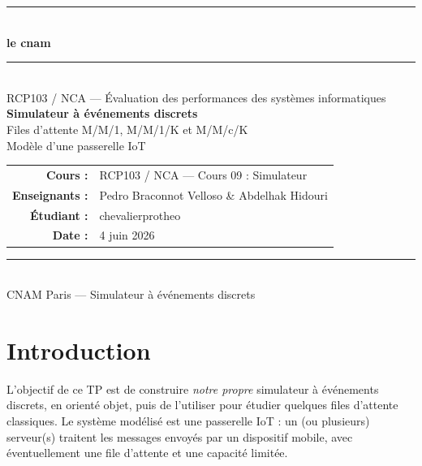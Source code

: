 \documentclass[11pt,a4paper]{article}
\begin{document}
\begin{titlepage}
\begin{center}
\vspace*{1cm}

{\color{cnamred}\rule{\textwidth}{2pt}}\\[0.3cm]
{\Large\bfseries le cnam}\\[0.2cm]
{\color{cnamred}\rule{\textwidth}{2pt}}\\[3cm]

{\Large RCP103 / NCA --- Évaluation des performances des systèmes informatiques}\\[1.5cm]

{\color{cnamred}\Huge\bfseries Simulateur à événements discrets}\\[0.6cm]
{\LARGE Files d'attente M/M/1, M/M/1/K et M/M/c/K}\\[0.4cm]
{\large Modèle d'une passerelle IoT}\\[3cm]

\begin{tabular}{rl}
\textbf{Cours :} & RCP103 / NCA --- Cours 09 : Simulateur\\[0.3cm]
\textbf{Enseignants :} & Pedro Braconnot Velloso \& Abdelhak Hidouri\\[0.3cm]
\textbf{Étudiant :} & chevalierprotheo\\[0.3cm]
\textbf{Date :} & 4 juin 2026\\
\end{tabular}

\vfill
{\color{cnamred}\rule{\textwidth}{1pt}}\\
{\small CNAM Paris --- Simulateur à événements discrets}
\end{center}
\end{titlepage}

\section{Introduction}
L'objectif de ce TP est de construire \emph{notre propre} simulateur à événements
discrets, en orienté objet, puis de l'utiliser pour étudier quelques files
d'attente classiques. Le système modélisé est une passerelle IoT : un (ou
plusieurs) serveur(s) traitent les messages envoyés par un dispositif mobile,
avec éventuellement une file d'attente et une capacité limitée.
\end{document}
